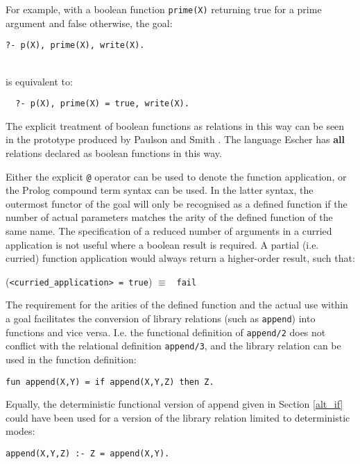 For example, with a boolean function \texttt{prime(X)} returning true for
a prime argument and false otherwise, the goal:\\
\centerline{\texttt{?- p(X), prime(X), write(X).~~}}\\
is equivalent to:\\
\centerline{\texttt{~~?- p(X), prime(X) = true, write(X).}}

The explicit treatment of boolean functions as relations
in this way can be seen in the prototype
produced by Paulson and Smith \cite{PS91}.
The language Escher \cite{Llo94}
has \textbf{all} relations declared as boolean functions in this way.

Either the explicit \texttt{@} operator can be used to
denote the function application, or the Prolog compound term syntax can
be used.  In the latter syntax, the outermost functor of the goal will
only be recognised as a defined function if the number of actual parameters
matches the arity of the defined function of the same name.  The specification
of a reduced number of arguments in a curried application is not useful where
a boolean result is required.  A partial (i.e. curried) function application
would always return a higher-order result, such that:\\
\centerline{(\texttt{<curried\_{}application> = true}) $\equiv$ \texttt{~fail}}

The requirement for the arities of the defined function and the actual use within
a goal
facilitates the conversion of library relations (such as \texttt{append}) into
functions and vice versa.  I.e. the functional definition of \texttt{append/2}
does not conflict with the relational definition \texttt{append/3}, and the
library relation can be used in the function definition:
\begin{verbatim}
fun append(X,Y) = if append(X,Y,Z) then Z.
\end{verbatim}
Equally, the deterministic functional version of append
given in Section \ref{alt_if} could have been used for a
version of the library relation limited to deterministic modes:
\begin{verbatim}
append(X,Y,Z) :- Z = append(X,Y).
\end{verbatim}


